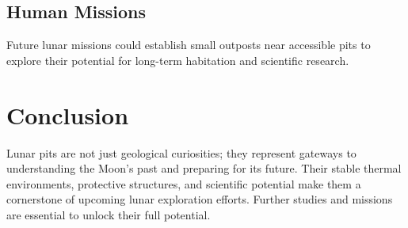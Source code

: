 \documentclass[12pt]{article}
\begin{document}
\subsection{Human Missions}
Future lunar missions could establish small outposts near accessible pits to explore their potential for long-term habitation and scientific research.


\section{Conclusion}
Lunar pits are not just geological curiosities; they represent gateways to understanding the Moon’s past and preparing for its future. Their stable thermal environments, protective structures, and scientific potential make them a cornerstone of upcoming lunar exploration efforts. Further studies and missions are essential to unlock their full potential.



\end{document}

